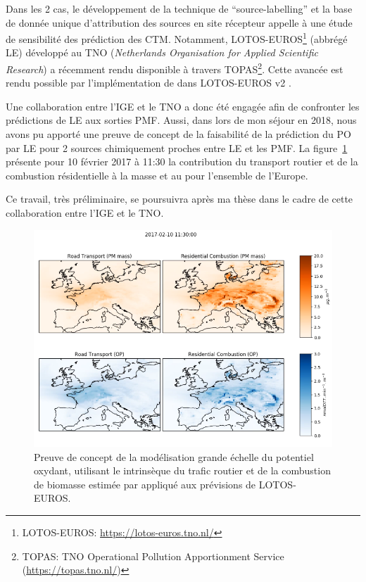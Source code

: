 Dans les 2 cas, le développement de la technique de ``source-labelling'' et la base de
donnée unique d'attribution des sources en site récepteur appelle à une étude de
sensibilité des prédiction des CTM. Notamment, LOTOS-EUROS\footnote{LOTOS-EUROS:
    \url{https://lotos-euros.tno.nl/}} (abbrégé LE) développé au TNO (\textit{Netherlands Organisation for
Applied Scientific Research}) a récemment rendu disponible à travers TOPAS\footnote{TOPAS:
TNO Operational Pollution Apportionment Service (\url{https://topas.tno.nl/})}. Cette
avancée est rendu possible par l'implémentation de \cite{kranenburgSource2013} dans
LOTOS-EUROS v2 \autocite{mandersCurriculum2017}.

Une collaboration entre l'IGE et le TNO a donc été engagée afin de confronter les
prédictions de LE aux sorties PMF. Aussi, dans lors de mon séjour en 2018, nous
avons pu apporté une preuve de concept de la faisabilité de la prédiction du PO par
LE pour 2 sources chimiquement proches entre LE et les PMF.
La figure~\ref{fig:OPmap} présente pour 10 février 2017 à 11:30 la contribution du
transport routier et de la combustion résidentielle à la masse et au \PODTTv{} pour
l'ensemble de l'Europe.

Ce travail, très préliminaire, se poursuivra après ma thèse dans le cadre de cette
collaboration entre l'IGE et le TNO.

\begin{figure}[ht]
    \centering
    \includegraphics[width=0.8\linewidth]{figures/chapter05/OPmap.png}
    \caption{Preuve de concept de la modélisation grande échelle du potentiel oxydant,
    utilisant le \PODTT{} intrinsèque du trafic routier et de la combustion de biomasse
estimée par \cite{weberSourceinprep.} appliqué aux prévisions de LOTOS-EUROS.}%
    \label{fig:OPmap}
\end{figure}

